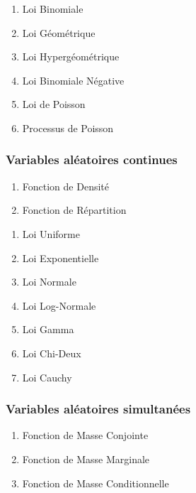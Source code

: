 \documentclass{article}
\begin{document}


\begin{enumerate}
    \item Loi Binomiale
    \item Loi Géométrique
    \item Loi Hypergéométrique
    \item Loi Binomiale Négative
    \item Loi de Poisson
    \item Processus de Poisson
\end{enumerate}

\subsubsection{Variables aléatoires continues}


\begin{enumerate}
    \item Fonction de Densité
    \item Fonction de Répartition
\end{enumerate}


\begin{enumerate}
    \item Loi Uniforme
    \item Loi Exponentielle
    \item Loi Normale
    \item Loi Log-Normale
    \item Loi Gamma
    \item Loi Chi-Deux
    \item Loi Cauchy
\end{enumerate}

\subsubsection{Variables aléatoires simultanées}


\begin{enumerate}
    \item Fonction de Masse Conjointe
    \item Fonction de Masse Marginale
    \item Fonction de Masse Conditionnelle
\end{enumerate}
\end{document}
